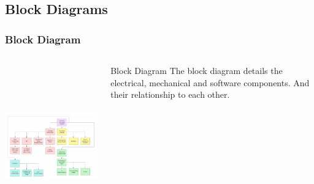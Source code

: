 \documentclass[aspectratio=169]{beamer}
\begin{document}
\subsection{Block Diagrams}
\begin{frame}
    \frametitle{Block Diagram}

    \begin{columns}
        \begin{column}{0.70\textwidth}
            \includegraphics[height=7cm]{BlockDiagram}
        \end{column}

        \begin{column}{0.30\textwidth}
            \begin{block}{Block Diagram}
                The block diagram details the electrical, mechanical and software components.
                And their relationship to each other.
            \end{block}
        \end{column}
    \end{columns}


\end{frame}
\end{document}
